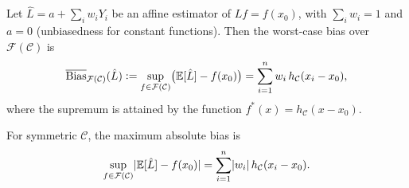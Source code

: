 \begin{proposition}\label{prop:wcb}
	Let $\hat{L} = a + \sum_{i} w_i Y_i$ be an affine estimator of $Lf = f(x_0)$, with $\sum_i w_i = 1$ and $a = 0$ (unbiasedness for constant functions).
	Then the worst-case bias over $\mathcal{F}(\mathcal{C})$ is
	\begin{equation}\label{eq:wcb_general}
		\overline{\mathrm{Bias}}_{\mathcal{F}(\mathcal{C})}(\hat{L}) \vcentcolon= \sup_{f \in \mathcal{F}(\mathcal{C})} \bigl( \operatorname{\mathbb{E}}[\hat{L}] - f(x_0) \bigr) = \sum_{i=1}^n w_i \, h_{\mathcal{C}}(x_i - x_0),
	\end{equation}
	where the supremum is attained by the function $f^*(x) = h_{\mathcal{C}}(x - x_0)$.

	For symmetric $\mathcal{C}$, the maximum absolute bias is
	\begin{equation}\label{eq:wcb_abs}
		\sup_{f \in \mathcal{F}(\mathcal{C})} \lvert\operatorname{\mathbb{E}}[\hat{L}] - f(x_0)\rvert = \sum_{i=1}^n \lvert w_i\rvert \, h_{\mathcal{C}}(x_i - x_0).
	\end{equation}
\end{proposition}

